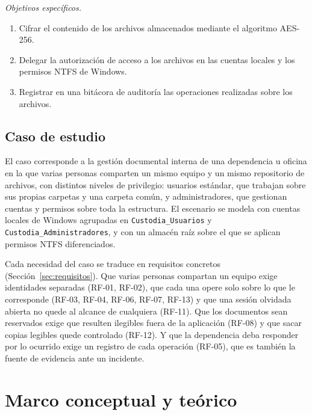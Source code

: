 \documentclass[conference]{IEEEtran}
\begin{document}
\textit{Objetivos específicos.}
\begin{enumerate}
    \item Cifrar el contenido de los archivos almacenados mediante el algoritmo AES-256.
    \item Delegar la autorización de acceso a los archivos en las cuentas locales y los permisos NTFS de Windows.
    \item Registrar en una bitácora de auditoría las operaciones realizadas sobre los archivos.
\end{enumerate}

\subsection{Caso de estudio}
\label{sec:caso}
El caso corresponde a la gestión documental interna de una dependencia u oficina en la que varias personas comparten un mismo equipo y un mismo repositorio de archivos, con distintos niveles de privilegio: usuarios estándar, que trabajan sobre sus propias carpetas y una carpeta común, y administradores, que gestionan cuentas y permisos sobre toda la estructura. El escenario se modela con cuentas locales de Windows agrupadas en \texttt{Custodia\_Usuarios} y \texttt{Custodia\_Administradores}, y con un almacén raíz sobre el que se aplican permisos NTFS diferenciados.

Cada necesidad del caso se traduce en requisitos concretos (Sección~\ref{sec:requisitos}). Que varias personas compartan un equipo exige identidades separadas (RF-01, RF-02), que cada una opere solo sobre lo que le corresponde (RF-03, RF-04, RF-06, RF-07, RF-13) y que una sesión olvidada abierta no quede al alcance de cualquiera (RF-11). Que los documentos sean reservados exige que resulten ilegibles fuera de la aplicación (RF-08) y que sacar copias legibles quede controlado (RF-12). Y que la dependencia deba responder por lo ocurrido exige un registro de cada operación (RF-05), que es también la fuente de evidencia ante un incidente.

\section{Marco conceptual y teórico}
\label{sec:marco}
\end{document}

